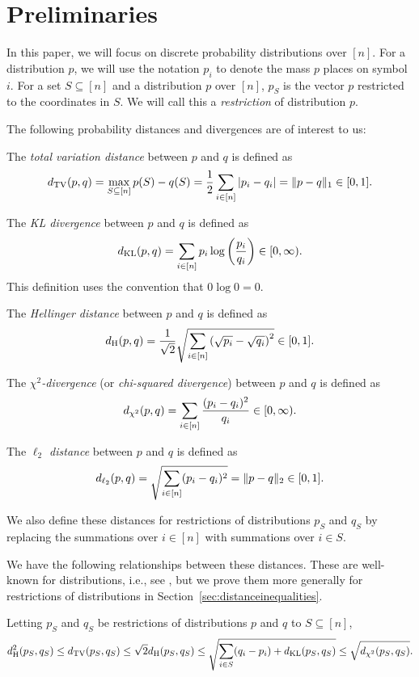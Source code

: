 \section{Preliminaries}
\label{sec:preliminaries}
In this paper, we will focus on discrete probability distributions over $[n]$.
For a distribution $p$, we will use the notation $p_i$ to denote the mass $p$ places on symbol $i$.
For a set $S \subseteq [n]$ and a distribution $p$ over $[n]$, $p_S$ is the vector $p$ restricted to the coordinates in $S$.
We will call this a \emph{restriction} of distribution $p$.

 
The following probability distances and divergences are of interest to us:
\begin{definition}
The \emph{total variation distance} between $p$ and $q$ is defined as
$$d_{\mathrm {TV}}(p,q) = \max_{S \subseteq [n]} p(S) - q(S) = \frac12\sum_{i \in [n]} \left|p_i - q_i\right| = \|p - q\|_1 \in [0,1].$$
\end{definition}

\begin{definition}
The \emph{KL divergence} between $p$ and $q$ is defined as
$$d_{\mathrm {KL}}(p,q) = \sum_{i \in [n]} p_i \log \left(\frac{p_i}{q_i}\right) \in [0, \infty).$$
This definition uses the convention that $0 \log 0 = 0$.
\end{definition}

\begin{definition}
The \emph{Hellinger distance} between $p$ and $q$ is defined as 
$$d_{\mathrm {H}}(p,q) = \frac{1}{\sqrt{2}}\sqrt{\sum_{i \in [n]} \left(\sqrt{p_i} - \sqrt{q_i}\right)^2} \in [0,1].$$
\end{definition}

\begin{definition}
The \emph{$\chi^2$-divergence} (or \emph{chi-squared divergence}) between $p$ and $q$ is defined as
$$d_{\chi^2}(p,q) = \sum_{i \in [n]} \frac{(p_i - q_i)^2}{q_i} \in [0,\infty).$$
\end{definition}

\begin{definition}
The \emph{$\ell_2$ distance} between $p$ and $q$ is defined as
$$d_{\ell_2}(p,q) = \sqrt{\sum_{i \in [n]} (p_i - q_i)^2} = \|p-q\|_2 \in [0,1].$$
\end{definition}
\noindent
We also define these distances for restrictions of distributions $p_S$ and $q_S$ by replacing the summations over $i \in [n]$ with summations over $i \in S$.

We have the following relationships between these distances.
These are well-known for distributions, i.e., see \cite{GibbsS02}, but we prove them more generally for restrictions of distributions in Section~\ref{sec:distanceinequalities}. 
\begin{proposition}
\label{prop:distanceinequalities}
Letting $p_S$ and $q_S$ be restrictions of distributions $p$ and $q$ to $S \subseteq [n]$,
$$d_{\mathrm {H}}^2(p_S,q_S) \leq d_{\mathrm {TV}}(p_S,q_S) \leq \sqrt{2}d_{\mathrm {H}}(p_S,q_S) \leq \sqrt{\sum_{i \in S} (q_i - p_i)  + d_{\mathrm {KL}}(p_S,q_S)} \leq \sqrt{d_{\chi^2}(p_S,q_S)}.$$
\end{proposition}

